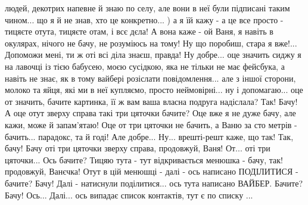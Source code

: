 людей, декотрих напевне й знаю по селу, але вони в неї були підписані таким
чином... що я й не знав, хто це конкретно... ) а я їй кажу - а це все просто -
тицяєте отута, тицяєте отам, і всє дєла! А вона каже - ой Ваня, я навіть в
окулярах, нічого не бачу, не розуміюсь на тому! Ну що поробиш, стара я вже!...
Допоможи мені, ти ж оті всі діла знаєш, правда!  Ну добре... оце значить сиджу
я на лавочці із тією бабусею, моєю сусідкою, яка не тільки не має фейсбука, а
навіть не знає, як в тому вайбері розіслати повідомлення... але з іншої
сторони, молоко та яйця, які ми в неї купляємо, просто неймовірні...  ну і
допомагаю... оце от значить, бачите картинка, її ж вам ваша власна подруга
надіслала?  Так! Бачу! А оце отут зверху справа такі три цяточки бачите?  Оце
вже я не дуже бачу, але кажи, може й запам'ятаю! Оце от три цяточки не бачить,
а Ваню за сто метрів - бачить...  парадокс, та й годі!  Але добре... Ну...
врешті-решт каже, що так! Так, бачу!  Бачу оті три цяточки зверху справа,
продовжуй, Ваня!  От... оті три цяточки... Ось бачите? Тицяю тута - тут
відкривається менюшка - бачу, так!  продовжуй, Ванєчка! Отут в цій менюшці -
далі - ось написано ПОДІЛИТИСЯ - бачите? Бачу!  Далі - натиснули поділитися...
ось тута написано ВАЙБЕР. Бачите? Бачу! Ось...  Далі... ось випадає список
контактів, тут є по списку ... 

